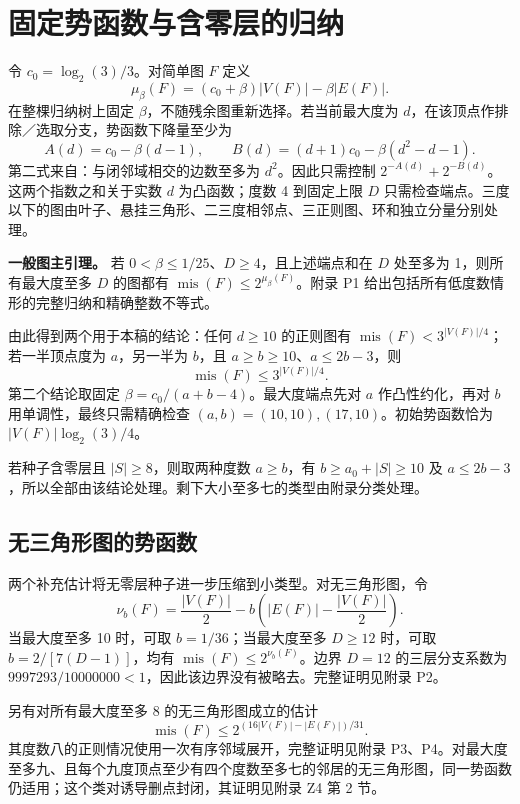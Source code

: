 \documentclass[11pt]{ctexart}
\begin{document}
\section{固定势函数与含零层的归纳}

令 \(c_0=\log_2(3)/3\)。对简单图 \(F\) 定义
\[
 \mu_\beta(F)=(c_0+\beta)|V(F)|-\beta|E(F)|.
\]
在整棵归纳树上固定 \(\beta\)，不随残余图重新选择。若当前最大度为 \(d\)，在该顶点作排除／选取分支，势函数下降量至少为
\[
 A(d)=c_0-\beta(d-1),\qquad
 B(d)=(d+1)c_0-\beta(d^2-d-1).
\]
第二式来自：与闭邻域相交的边数至多为 \(d^2\)。因此只需控制 \(2^{-A(d)}+2^{-B(d)}\)。这两个指数之和关于实数 \(d\) 为凸函数；度数 4 到固定上限 \(D\) 只需检查端点。三度以下的图由叶子、悬挂三角形、二三度相邻点、三正则图、环和独立分量分别处理。

\textbf{一般图主引理。} 若 \(0<\beta\le1/25\)、\(D\ge4\)，且上述端点和在 \(D\) 处至多为 1，则所有最大度至多 \(D\) 的图都有 \(\operatorname{mis}(F)\le2^{\mu_\beta(F)}\)。附录 P1 给出包括所有低度数情形的完整归纳和精确整数不等式。

由此得到两个用于本稿的结论：任何 \(d\ge10\) 的正则图有 \(\operatorname{mis}(F)<3^{|V(F)|/4}\)；若一半顶点度为 \(a\)，另一半为 \(b\)，且 \(a\ge b\ge10\)、\(a\le2b-3\)，则
\[
 \operatorname{mis}(F)\le3^{|V(F)|/4}.
\]
第二个结论取固定 \(\beta=c_0/(a+b-4)\)。最大度端点先对 \(a\) 作凸性约化，再对 \(b\) 用单调性，最终只需精确检查 \((a,b)=(10,10),(17,10)\)。初始势函数恰为 \(|V(F)|\log_2(3)/4\)。

若种子含零层且 \(|S|\ge8\)，则取两种度数 \(a\ge b\)，有 \(b\ge a_0+|S|\ge10\) 及 \(a\le2b-3\)，所以全部由该结论处理。剩下大小至多七的类型由附录分类处理。

\subsection{无三角形图的势函数}

两个补充估计将无零层种子进一步压缩到小类型。对无三角形图，令
\[
 \nu_b(F)=\frac{|V(F)|}{2}
 -b\left(|E(F)|-\frac{|V(F)|}{2}\right).
\]
当最大度至多 10 时，可取 \(b=1/36\)；当最大度至多 \(D\ge12\) 时，可取 \(b=2/[7(D-1)]\)，均有 \(\operatorname{mis}(F)\le2^{\nu_b(F)}\)。边界 \(D=12\) 的三层分支系数为 \(9997293/10000000<1\)，因此该边界没有被略去。完整证明见附录 P2。

另有对所有最大度至多 8 的无三角形图成立的估计
\[
 \operatorname{mis}(F)\le2^{(16|V(F)|-|E(F)|)/31}.
\]
其度数八的正则情况使用一次有序邻域展开，完整证明见附录 P3、P4。对最大度至多九、且每个九度顶点至少有四个度数至多七的邻居的无三角形图，同一势函数仍适用；这个类对诱导删点封闭，其证明见附录 Z4 第 2 节。
\end{document}
